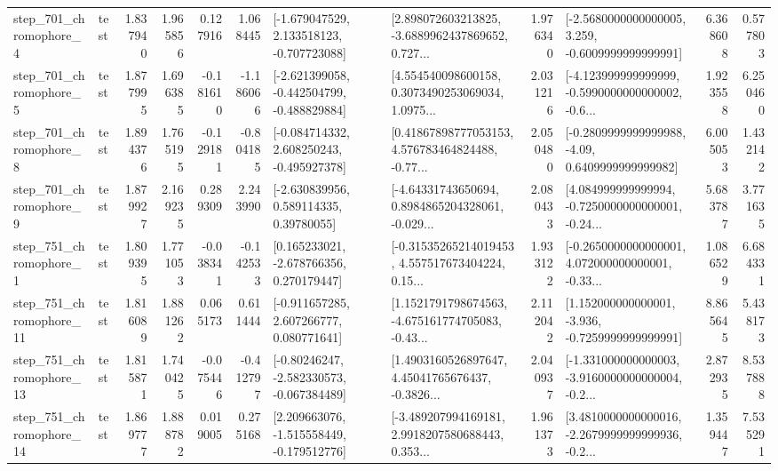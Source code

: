 \begin{tabular}{llrrrrllrlrr}
   step\_701\_chromophore\_4 &      test &      1.837940 &    1.965856 &      0.127916 &  1.068445 &   [-1.679047529, 2.133518123, -0.707723088] &  [2.898072603213825, -3.6889962437869652, 0.727... &       1.976340 &  [-2.5680000000000005, 3.259, -0.6009999999999991] &            6.368608 &          0.577803 \\
   step\_701\_chromophore\_5 &      test &      1.877995 &    1.696385 &     -0.181610 & -1.186066 &  [-2.621399058, -0.442504799, -0.488829884] &  [4.554540098600158, 0.3073490253069034, 1.0975... &       2.031216 &  [-4.123999999999999, -0.5990000000000002, -0.6... &            1.923558 &          6.250460 \\
   step\_701\_chromophore\_8 &      test &      1.894376 &    1.765195 &     -0.129181 & -0.804185 &   [-0.084714332, 2.608250243, -0.495927378] &  [0.41867898777053153, 4.576783464824488, -0.77... &       2.050480 &   [-0.2809999999999988, -4.09, 0.6409999999999982] &            6.005053 &          1.432142 \\
   step\_701\_chromophore\_9 &      test &      1.879927 &    2.169235 &      0.289309 &  2.243990 &     [-2.630839956, 0.589114335, 0.39780055] &  [-4.64331743650694, 0.8984865204328061, -0.029... &       2.080433 &  [4.084999999999994, -0.7250000000000001, -0.24... &            5.683787 &          3.771635 \\
   step\_751\_chromophore\_1 &      test &      1.809395 &    1.771053 &     -0.038341 & -0.142533 &    [0.165233021, -2.678766356, 0.270179447] &  [-0.31535265214019453, 4.557517673404224, 0.15... &       1.933122 &  [-0.2650000000000001, 4.072000000000001, -0.33... &            1.086529 &          6.684331 \\
  step\_751\_chromophore\_11 &      test &      1.816089 &    1.881262 &      0.065173 &  0.611444 &    [-0.911657285, 2.607266777, 0.080771641] &  [1.1521791798674563, -4.675161774705083, -0.43... &       2.112042 &   [1.152000000000001, -3.936, -0.7259999999999991] &            8.865645 &          5.438173 \\
  step\_751\_chromophore\_13 &      test &      1.815871 &    1.740425 &     -0.075446 & -0.412797 &   [-0.80246247, -2.582330573, -0.067384489] &  [1.4903160526897647, 4.45041765676437, -0.3826... &       2.040937 &  [-1.331000000000003, -3.9160000000000004, -0.2... &            2.872935 &          8.537888 \\
  step\_751\_chromophore\_14 &      test &      1.869777 &    1.888782 &      0.019005 &  0.275168 &   [2.209663076, -1.515558449, -0.179512776] &  [-3.489207994169181, 2.9918207580688443, 0.353... &       1.961373 &  [3.4810000000000016, -2.2679999999999936, -0.2... &            1.359447 &          7.535291 \\

\end{tabular}
